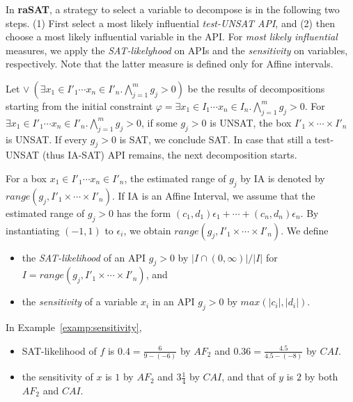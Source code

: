 \documentclass[runningheads,a4paper,oribibl]{llncs}
\newcommand{\suppress}[1]{} %
\begin{document}
\suppress{
With several hundred variables, we observe that an SMT solver works
when either SAT, or UNSAT with small UNSAT core.
%
For the latter, we need an efficient heuristics to find an UNSAT core, which is left as future work. 
For the former, the keys are how to choose variables to decompose, and 
how to choose a box to explore.
}%

In {\bf raSAT}, a strategy to select a variable to decompose is in the following two steps. 
(1) First select a most likely influential {\em test-UNSAT API}, and
(2) then choose a most likely influential variable in the API. 
For {\em most likely influential} measures, we apply the {\em SAT-likelyhood} on APIs and
the {\em sensitivity} on variables, respectively. Note that the latter measure is defined
only for Affine intervals. 

\sloppy
Let ${\vee~( \exists x_1 \in I'_1 \cdots x_n \in I'_n. \bigwedge \limits_{j=1}^m g_j > 0)}$
be the results of decompositions starting from the initial constraint
$\varphi = \exists x_1 \in I_1 \cdots x_n \in I_n. \bigwedge \limits_{j=1}^m g_j > 0$. 
For ${\exists x_1 \in I'_1 \cdots x_n \in I'_n. \bigwedge \limits_{j=1}^m g_j > 0}$, 
if some $g_j > 0$ is UNSAT, the box $I'_1 \times \cdots \times I'_n$ is UNSAT. 
If every $g_j > 0$ is SAT, we conclude SAT. 
In case that still a test-UNSAT (thus IA-SAT) API remains, 
the next decomposition starts. 

For a box $x_1 \in I'_1 \cdots x_n \in I'_n$, 
the estimated range of $g_j$ by IA is denoted by $range(g_j, I'_1 \times \cdots \times I'_n)$. 
If IA is an Affine Interval,
we assume that the estimated range of $g_j > 0$ has the form
${(c_1,d_1)\epsilon_1 + \cdots + (c_n,d_n)\epsilon_n}$.
By instantiating $(-1,1)$ to $\epsilon_i$, we obtain $range(g_j, I'_1 \times \cdots \times I'_n)$. 
We define 
\begin{itemize} 
\item the {\em SAT-likelihood} of an API $g_j > 0$ by $| I \cap (0,\infty) | / |I|$
  for  $I = range(g_j, I'_1 \times \cdots \times I'_n)$, and 
\item the {\em sensitivity} of a variable $x_i$ in an API $g_j > 0$ by $max(|c_i|, |d_i|)$. 
\end{itemize} 

\begin{example} \label{examp:SATlikelihood}
In Example~\ref{examp:sensitivity}, 
\begin{itemize}
\item SAT-likelihood of $f$ is $0.4= \frac{6}{9-(-6)}$ by $AF_2$ 
and $0.36 = \frac{4.5}{4.5-(-8)}$ by $CAI$. 
\item the sensitivity of $x$ is $1$ by $AF_2$ and $3\frac{1}{4}$ by $CAI$,
  and that of $y$ is $2$ by both $AF_2$ and $CAI$. 
\end{itemize}
\end{example}
\end{document}
